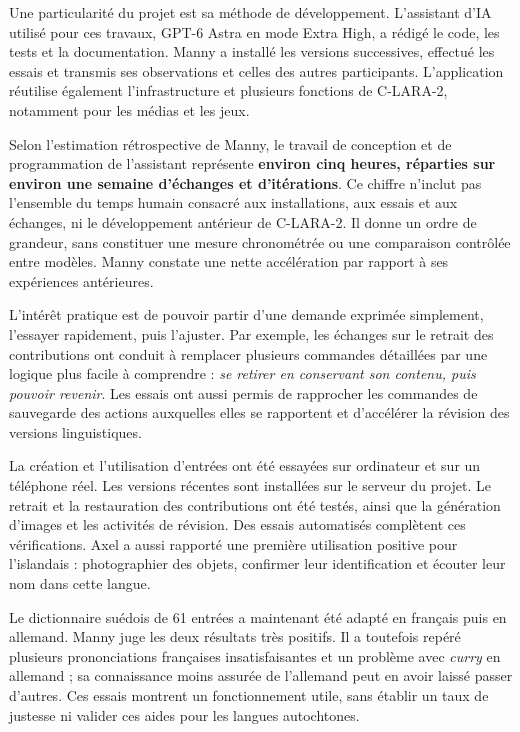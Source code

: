 \documentclass[11pt,a4paper]{article}
\newcommand{\rubrique}[1]{\vspace{5pt}{\large\bfseries\textcolor{accent}{#1}\par}\vspace{2pt}}
\begin{document}
\newpage
\rubrique{Un développement rapide, avec des retours humains essentiels}
Une particularité du projet est sa méthode de développement. L'assistant d'IA
utilisé pour ces travaux, GPT-6 Astra en mode Extra High, a rédigé le code, les
tests et la documentation. Manny a installé les versions successives, effectué
les essais et transmis ses observations et celles des autres participants.
L'application réutilise également l'infrastructure et plusieurs fonctions de
C-LARA-2, notamment pour les médias et les jeux.

Selon l'estimation rétrospective de Manny, le travail de conception et de
programmation de l'assistant représente \textbf{environ cinq heures, réparties
sur environ une semaine d'échanges et d'itérations}. Ce chiffre n'inclut pas
l'ensemble du temps humain consacré aux installations, aux essais et aux échanges,
ni le développement antérieur de C-LARA-2. Il donne un ordre de grandeur, sans
constituer une mesure chronométrée ou une comparaison contrôlée entre modèles.
Manny constate une nette accélération par rapport à ses expériences antérieures.

L'intérêt pratique est de pouvoir partir d'une demande exprimée simplement,
l'essayer rapidement, puis l'ajuster. Par exemple, les échanges sur le retrait des
contributions ont conduit à remplacer plusieurs commandes détaillées par une
logique plus facile à comprendre : \emph{se retirer en conservant son contenu,
puis pouvoir revenir}. Les essais ont aussi permis de rapprocher les commandes
de sauvegarde des actions auxquelles elles se rapportent et d'accélérer la
révision des versions linguistiques.

\rubrique{Ce qui a été essayé, et ce qu'il reste à apprendre}
La création et l'utilisation d'entrées ont été essayées sur ordinateur et sur un
téléphone réel. Les versions récentes sont installées sur le serveur du projet.
Le retrait et la restauration des contributions ont été testés, ainsi que la
génération d'images et les activités de révision. Des essais automatisés complètent
ces vérifications. Axel a aussi rapporté une première utilisation positive pour
l'islandais : photographier des objets, confirmer leur identification et écouter
leur nom dans cette langue.

Le dictionnaire suédois de 61 entrées a maintenant été adapté en français puis en
allemand. Manny juge les deux résultats très positifs. Il a toutefois repéré
plusieurs prononciations françaises insatisfaisantes et un problème avec
\emph{curry} en allemand ; sa connaissance moins assurée de l'allemand peut en
avoir laissé passer d'autres. Ces essais montrent un fonctionnement utile, sans
établir un taux de justesse ni valider ces aides pour les langues autochtones.
\end{document}
